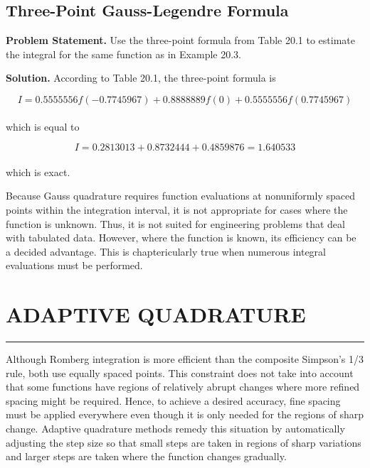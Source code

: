 \documentclass[../main.tex]{subfiles}
\begin{document}
\subsection{Three-Point Gauss-Legendre Formula}
\textbf{Problem Statement.} Use the three-point formula from Table 20.1 to estimate the integral for the same function as in Example 20.3.

\textbf{Solution.} According to Table 20.1, the three-point formula is

	$$I=0.5555556f(−0.7745967)+ 0.8888889 f (0) + 0.5555556 f (0.7745967)$$\\
which is equal to

	$$I = 0.2813013 + 0.8732444 + 0.4859876 = 1.640533$$\\
which is exact.

\vspace{0.6in}

Because Gauss quadrature requires function evaluations at nonuniformly spaced points
within the integration interval, it is not appropriate for cases where the function is unknown.
Thus, it is not suited for engineering problems that deal with tabulated data. However, where
the function is known, its efficiency can be a decided advantage. This is chaptericularly true
when numerous integral evaluations must be performed.

\vspace{0,6in}
\section{ADAPTIVE QUADRATURE}
\vspace{0,1in}
\hrule
\vspace{0,1in}
Although Romberg integration is more efficient than the composite Simpson's 1/3 rule,
both use equally spaced points. This constraint does not take into account that some functions have regions of relatively abrupt changes where more refined spacing might be required. Hence, to achieve a desired accuracy, fine spacing must be applied everywhere
even though it is only needed for the regions of sharp change. Adaptive quadrature methods remedy this situation by automatically adjusting the step size so that small steps are
taken in regions of sharp variations and larger steps are taken where the function changes
gradually.
\end{document}
